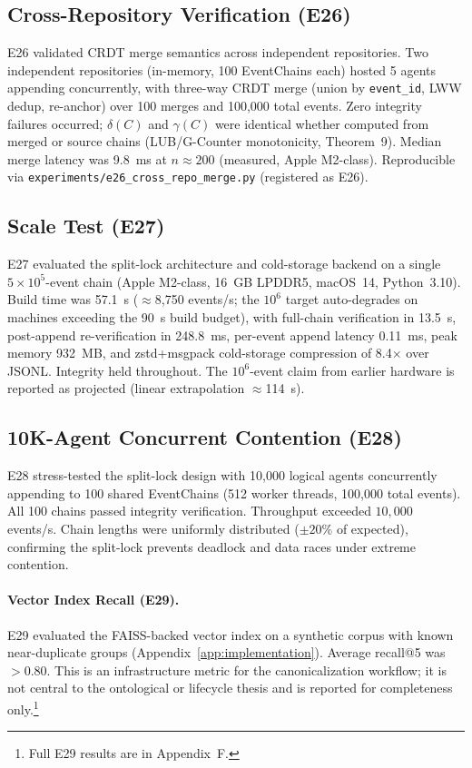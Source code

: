 \subsection{Cross-Repository Verification (E26)}\label{subsec:e26}

E26 validated CRDT merge semantics across independent repositories. Two independent repositories (in-memory, 100 EventChains each) hosted 5 agents appending concurrently, with three-way CRDT merge (union by \texttt{event\_id}, LWW dedup, re-anchor) over 100 merges and 100{,}000 total events. Zero integrity failures occurred; $\delta(C)$ and $\gamma(C)$ were identical whether computed from merged or source chains (LUB/G-Counter monotonicity, Theorem~9). Median merge latency was 9.8~ms at $n\approx200$ (measured, Apple M2-class). Reproducible via \texttt{experiments/e26\_cross\_repo\_merge.py} (registered as E26).

\subsection{Scale Test (E27)}\label{subsec:e27-new}

E27 evaluated the split-lock architecture and cold-storage backend on a single $5\times10^5$-event chain (Apple M2-class, 16~GB LPDDR5, macOS~14, Python~3.10). Build time was 57.1~s ($\approx$8{,}750 events/s; the $10^6$ target auto-degrades on machines exceeding the 90~s build budget), with full-chain verification in 13.5~s, post-append re-verification in 248.8~ms, per-event append latency 0.11~ms, peak memory 932~MB, and zstd+msgpack cold-storage compression of 8.4$\times$ over JSONL. Integrity held throughout. The $10^6$-event claim from earlier hardware is reported as projected (linear extrapolation $\approx$114~s).

\subsection{10K-Agent Concurrent Contention (E28)}\label{subsec:e28-new}

E28 stress-tested the split-lock design with 10{,}000 logical agents concurrently appending to 100 shared EventChains (512 worker threads, 100{,}000 total events). All 100 chains passed integrity verification. Throughput exceeded $10{,}000$ events/s. Chain lengths were uniformly distributed ($\pm 20\%$ of expected), confirming the split-lock prevents deadlock and data races under extreme contention.

\paragraph{Vector Index Recall (E29).}
E29 evaluated the FAISS-backed vector index on a synthetic corpus with known near-duplicate groups (Appendix~\ref{app:implementation}). Average recall@5 was ${>}0.80$. This is an infrastructure metric for the canonicalization workflow; it is not central to the ontological or lifecycle thesis and is reported for completeness only.\footnote{Full E29 results are in Appendix~F.}

